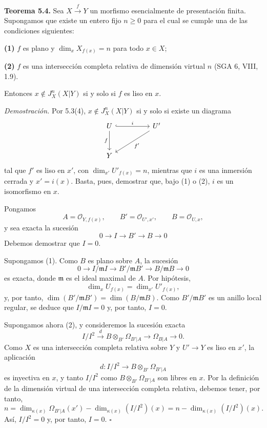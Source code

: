 \par\medskip
\noindent\textbf{Teorema 5.4.}
Sea $X\xrightarrow{f}Y$ un morfismo esencialmente de presentación
finita. Supongamos que existe un entero fijo $n\geq0$ para el cual se
cumple una de las condiciones siguientes:

\smallskip
\noindent\textbf{(1)} $f$ es plano y
$\dim_xX_{f(x)}=n$ para todo $x\in X$;

\smallskip
\noindent\textbf{(2)} $f$ es una intersección completa relativa de
dimensión virtual $n$ (SGA 6, VIII, 1.9).

\smallskip
Entonces $x\notin J_X^n(X|Y)$ si y solo si $f$ es liso en $x$.

\smallskip
\noindent\textit{Demostración.}
Por 5.3(4), $x\notin J_X^n(X|Y)$ si y solo si existe un diagrama
\[
\begin{tikzcd}[column sep=huge,row sep=large]
U \arrow[r,hook,"i"] \arrow[d,"f"']
  & U' \arrow[dl,"f'"] \\
Y & {}
\end{tikzcd}
\]
tal que $f'$ es liso en $x'$, con
$\dim_{x'}U'_{f(x)}=n$, mientras que $i$ es una inmersión cerrada y
$x'=i(x)$. Basta, pues, demostrar que, bajo (1) o (2), $i$ es un
isomorfismo en $x$.

Pongamos
\[
A=\mathcal O_{Y,f(x)},\qquad
B'=\mathcal O_{U',x'},\qquad B=\mathcal O_{U,x},
\]
y sea exacta la sucesión
\[
0\longrightarrow I\longrightarrow B'\longrightarrow B
\longrightarrow0
\]
Debemos demostrar que $I=0$.

Supongamos (1). Como $B$ es plano sobre $A$, la sucesión
\[
0\longrightarrow I/\mathfrak mI
\longrightarrow B'/\mathfrak mB'
\longrightarrow B/\mathfrak mB\longrightarrow0
\]
es exacta, donde $\mathfrak m$ es el ideal maximal de $A$. Por
hipótesis,
\[
\dim_xU_{f(x)}=\dim_{x'}U'_{f(x)},
\]
y, por tanto,
$\dim(B'/\mathfrak mB')=\dim(B/\mathfrak mB)$. Como
$B'/\mathfrak mB'$ es un anillo local regular, se deduce que
$I/\mathfrak mI=0$ y, por tanto, $I=0$.


Supongamos ahora (2), y consideremos la sucesión exacta
\[
I/I^2\xrightarrow{d}B\otimes_{B'}\Omega_{B'|A}
\longrightarrow\Omega_{B|A}\longrightarrow0.
\]
Como $X$ es una intersección completa relativa sobre $Y$ y
$U'\longrightarrow Y$ es liso en $x'$, la aplicación
\[
d:I/I^2\longrightarrow B\otimes_{B'}\Omega_{B'|A}
\]
es inyectiva en $x$, y tanto $I/I^2$ como
$B\otimes_{B'}\Omega_{B'|A}$ son libres en $x$. Por la definición de
la dimensión virtual de una intersección completa relativa, debemos
tener, por tanto,
\[
n=\dim_{\kappa(x)}\Omega_{B'|A}(x')
  -\dim_{\kappa(x)}(I/I^2)(x)
 =n-\dim_{\kappa(x)}(I/I^2)(x).
\]
Así, $I/I^2=0$ y, por tanto, $I=0$. \hfill$\square$
